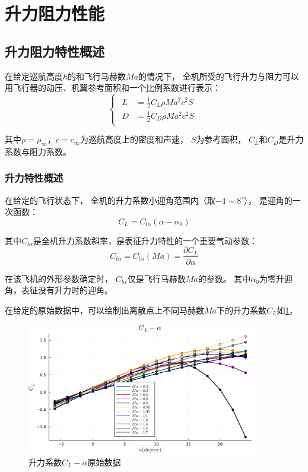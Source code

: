 \section{升力阻力性能}

\subsection{升力阻力特性概述}

在给定巡航高度$h$的和飞行马赫数$Ma$的情况下，
全机所受的飞行升力与阻力可以用飞行器的动压、机翼参考面积和一个比例系数进行表示：
\begin{equation}
    \begin{cases}
        \begin{aligned}
            L&=\frac{1}{2}C_L \rho Ma^2 c^2 S\\
            D&=\frac{1}{2}C_D \rho Ma^2 c^2 S
        \end{aligned}
    \end{cases}
\end{equation}

其中$\rho = \rho_{\infty}$，$c = c_{\infty}$为巡航高度上的密度和声速，
$S$为参考面积，
$C_L$和$C_D$是升力系数与阻力系数。

\subsubsection{升力特性概述}

在给定的飞行状态下，
全机的升力系数小迎角范围内（取$-4\sim 8 ^{\circ}$），
是迎角的一次函数：
\begin{equation}
    \label{升力线斜率关系}
    C_L = C_{l\alpha} (\alpha - \alpha_0)
\end{equation}

其中$C_{l\alpha}$是全机升力系数斜率，是表征升力特性的一个重要气动参数：
\begin{equation}
    C_{l\alpha}= C_{l\alpha}(Ma) = \frac{\partial C_L}{\partial \alpha} 
\end{equation}

在该飞机的外形参数确定时，
$C_{l\alpha}$仅是飞行马赫数$Ma$的参数。
其中$\alpha_0$为零升迎角，表征没有升力时的迎角。

在给定的原始数据中，可以绘制出离散点上不同马赫数$Ma$下的升力系数$C_L$如\ref{升力系数原始数据}。

\begin{figure}[H]
    \centering
    \includegraphics[width=0.9\textwidth]{image/ch3/CL_alpha_origin.pdf}
    \caption{升力系数$C_L-\alpha$原始数据}
    \label{升力系数原始数据}
\end{figure}

